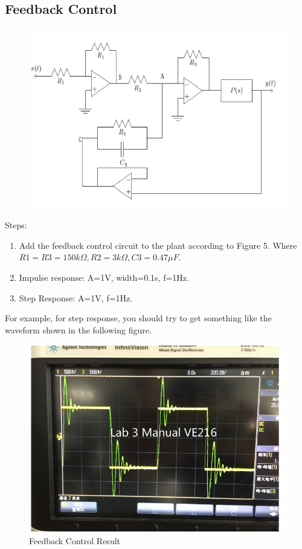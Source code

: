 \documentclass[12pt]{article}
\begin{document}
\subsection{Feedback Control}
\begin{figure}[H]
\centering
\includegraphics[scale=0.5]{P6.jpg}
\end{figure}
Steps:
\begin{enumerate}
\item Add the feedback control circuit to the plant according to Figure 5. Where $R1=R3=150k\Omega,R2=3k\Omega
,C3=0.47\mu F$.
\item Impulse response: A=1V, width=0.1s, f=1Hz.
\item Step Response: A=1V, f=1Hz.
\end{enumerate}
For example, for step response, you should try to get something like the waveform shown in the following
figure.
\begin{figure}[H]
\centering
\includegraphics[scale=0.45]{P7.jpg}
\caption{Feedback Control Result}
\end{figure}
\end{document}
